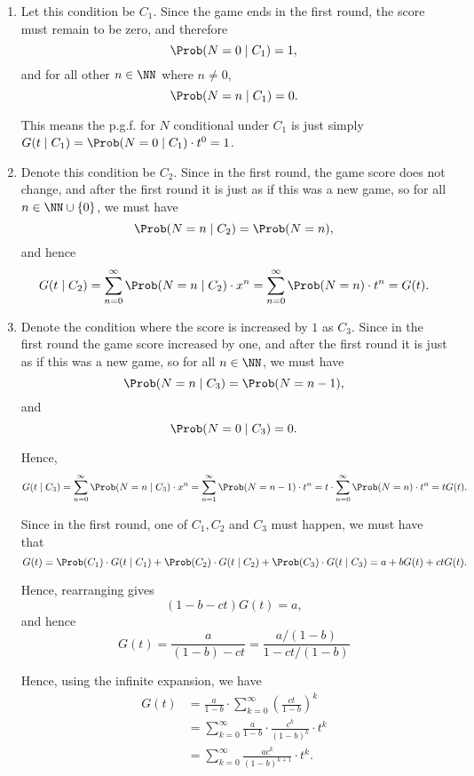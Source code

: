 \Question{\currfilebase}
\begin{enumerate}
    \item Let this condition be \(C_1\). Since the game ends in the first round, the score must remain to be zero, and therefore
          \[
              \Prob(N = 0 \mid C_1) = 1,
          \]
          and for all other \(n \in \NN\) where \(n \neq 0\),
          \[
              \Prob(N = n \mid C_1) = 0.
          \]

          This means the p.g.f. for \(N\) conditional under \(C_1\) is just simply \(G(t \mid C_1) = \Prob(N = 0 \mid C_1) \cdot t^0 = 1\).

    \item Denote this condition be \(C_2\). Since in the first round, the game score does not change, and after the first round it is just as if this was a new game, so for all \(n \in \NN \cup \{0\}\), we must have
          \[
              \Prob(N = n \mid C_2) = \Prob(N = n),
          \]
          and hence
          \[
              G(t \mid C_2) = \sum_{n = 0}^{\infty} \Prob(N = n \mid C_2) \cdot x^n = \sum_{n = 0}^{\infty} \Prob(N = n) \cdot t^n = G(t).
          \]

    \item Denote the condition where the score is increased by \(1\) as \(C_3\). Since in the first round the game score increased by one, and after the first round it is just as if this was a new game, so for all \(n \in \NN\), we must have
          \[
              \Prob(N = n \mid C_3) = \Prob(N = n - 1),
          \]
          and
          \[
              \Prob(N = 0 \mid C_3) = 0.
          \]

          Hence,
          \[
              G(t \mid C_3) = \sum_{n = 0}^{\infty} \Prob(N = n \mid C_3) \cdot x^n = \sum_{n = 1}^{\infty} \Prob(N = n - 1) \cdot t^n = t \cdot \sum_{n = 0}^{\infty} \Prob(N = n) \cdot t^n= tG(t).
          \]

          Since in the first round, one of \(C_1, C_2\) and \(C_3\) must happen, we must have that
          \[
              G(t) = \Prob(C_1) \cdot G(t \mid C_1) + \Prob(C_2) \cdot G(t \mid C_2) + \Prob(C_3) \cdot G(t \mid C_3) = a + b G(t) + ctG(t).
          \]

          Hence, rearranging gives
          \[
              (1 - b - ct) G(t) = a,
          \]
          and hence
          \[
              G(t) = \frac{a}{(1 - b) - ct} = \frac{a / (1 - b)}{1 - ct / (1 - b)}
          \]

          Hence, using the infinite expansion, we have
          \begin{align*}
              G(t) & = \frac{a}{1-b} \cdot \sum_{k = 0}^{\infty} \left(\frac{ct}{1 - b}\right)^k   \\
                   & = \sum_{k = 0}^{\infty} \frac{a}{1 - b} \cdot \frac{c^k}{(1 - b)^k} \cdot t^k \\
                   & = \sum_{k = 0}^{\infty} \frac{ac^k}{(1 - b)^{k + 1}} \cdot t^k.
          \end{align*}


\end{enumerate}
